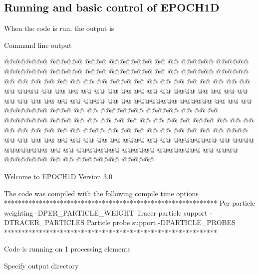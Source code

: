 \subsection{Running {\EPOCH} and basic control of EPOCH1D}
When the code is run, the output is
\begin{lboxverbatim}{Command line output}

     @@@@@@@@  @@@@@@      @@@@    @@@@@@@@  @@    @@    @@@@@@    @@@@@@       
     @@@@@@@@  @@@@@@      @@@@    @@@@@@@@  @@    @@    @@@@@@    @@@@@@       
     @@        @@    @@  @@    @@  @@        @@    @@      @@@@    @@  @@       
     @@        @@    @@  @@    @@  @@        @@    @@      @@@@    @@  @@       
     @@        @@    @@  @@    @@  @@        @@    @@      @@@@    @@    @@     
     @@        @@    @@  @@    @@  @@        @@    @@      @@@@    @@    @@     
     @@@@@@@@  @@@@@@    @@    @@  @@        @@@@@@@@      @@@@    @@    @@     
     @@@@@@@@  @@@@@@    @@    @@  @@        @@@@@@@@      @@@@    @@    @@     
     @@        @@        @@    @@  @@        @@    @@      @@@@    @@    @@     
     @@        @@        @@    @@  @@        @@    @@      @@@@    @@    @@     
     @@        @@        @@    @@  @@        @@    @@      @@@@    @@  @@       
     @@        @@        @@    @@  @@        @@    @@      @@@@    @@  @@       
     @@@@@@@@  @@          @@@@    @@@@@@@@  @@    @@    @@@@@@@@  @@@@@@       
     @@@@@@@@  @@          @@@@    @@@@@@@@  @@    @@    @@@@@@@@  @@@@@@       
                                                                                
                                                                                
                                                                                
                                                                                
 
 Welcome to EPOCH1D Version 3.0             
 
 The code was compiled with the following compile time options
 *************************************************************
 Per particle weighting -DPER_PARTICLE_WEIGHT
 Tracer particle support -DTRACER_PARTICLES
 Particle probe support -DPARTICLE_PROBES
 *************************************************************
 
 Code is running on 1 processing elements
 
 
 Specify output directory
\end{lboxverbatim}

